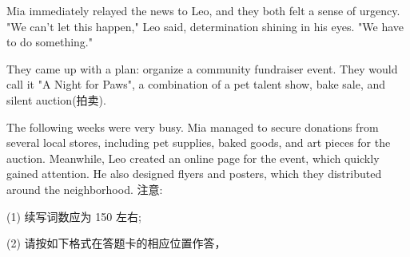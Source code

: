 \documentclass{英语试卷}
\begin{document}
\par Mia immediately relayed the news to Leo, and they both felt a sense of urgency. "We can't let this happen," Leo said, determination shining in his eyes. "We have to do something."\par
\par They came up with a plan: organize a community fundraiser event. They would call it "A Night for Paws", a combination of a pet talent show, bake sale, and silent auction(拍卖).\par
\par The following weeks were very busy. Mia managed to secure donations from several local stores, including pet supplies, baked goods, and art pieces for the auction. Meanwhile, Leo created an online page for the event, which quickly gained attention. He also designed flyers and posters, which they distributed around the neighborhood. 注意:\par
\par (1) 续写词数应为 150 左右;\par
\par (2) 请按如下格式在答题卡的相应位置作答，\par
{}
\end{document}
